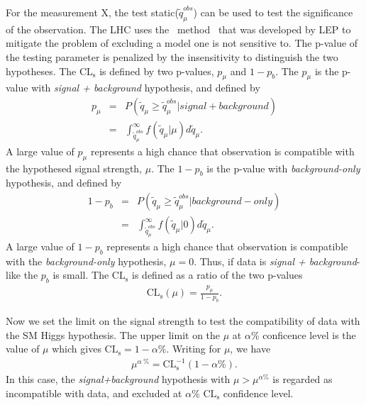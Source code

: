 %
For the measurement X, the test static($\tilde{q}_\mu^{obs}$) can be used to 
test the significance of the observation. The LHC uses the \CLs\ 
method~\cite{Read:451614,Junk:1999kv} that was developed by LEP 
to mitigate the problem of excluding a model one is not sensitive to. 
The p-value of the testing parameter is penalized by the insensitivity 
to distinguish the two hypotheses.  
The $\textrm{CL}_\textrm{s}$ is defined by two p-values, $p_\mu$ and $1-p_b$. 
The $p_\mu$ is the p-value with \textit{signal + background} hypothesis, and defined by 
\begin{eqnarray} 
p_\mu
&=& P\left(\tilde{q}_\mu \ge \tilde{q}_\mu^{obs} | signal+background \right)  \\
&=& \int^{\infty}_{\tilde{q}_\mu^{obs}}  f\left(  \tilde{q}_\mu | \mu \right) d\tilde{q}_\mu.
\end{eqnarray} 
A large value of $p_\mu$ represents a high chance that observation is compatible 
with the hypothesed signal strength, $\mu$.
The $1-p_b$ is the p-value with \textit{background-only} hypothesis, and defined by 
\begin{eqnarray} 
1-p_b
&=& P\left(\tilde{q}_\mu \ge \tilde{q}_\mu^{obs} | background-only \right)  \\
&=& \int^{\infty}_{\tilde{q}_\mu^{obs}}  f\left(  \tilde{q}_\mu | 0 \right) d\tilde{q}_\mu.
\end{eqnarray} 
A large value of $1-p_b$ represents a high chance that observation is compatible 
with the \textit{background-only} hypothesis, $\mu=0$. Thus, if data is 
\textit{signal + background}-like the $p_b$ is small. 
The $\textrm{CL}_\textrm{s}$ is defined as a ratio of the two p-values 
\begin{eqnarray} 
\textrm{CL}_\textrm{s} \left( \mu \right) = \frac{p_\mu}{1 - p_b}.   
\end{eqnarray} 

Now we set the limit on the signal strength to test the 
compatibility of data with the SM Higgs hypothesis. 
The upper limit on the $\mu$ at $\alpha$\% conficence level is the value of $\mu$  
which gives $\textrm{CL}_\textrm{s} = 1 - \alpha \%$. Writing for $\mu$, we have 
\begin{eqnarray} 
\mu^{\alpha~\%} = \textrm{CL}_\textrm{s}^{-1} ( 1-\alpha\%).
\end{eqnarray} 
In this case, the \textit{signal+background} hypothesis with $\mu > \mu^{\alpha \%}$
is regarded as incompatible with data, and excluded at $\alpha\%$ $\textrm{CL}_\textrm{s}$ 
confidence level.

